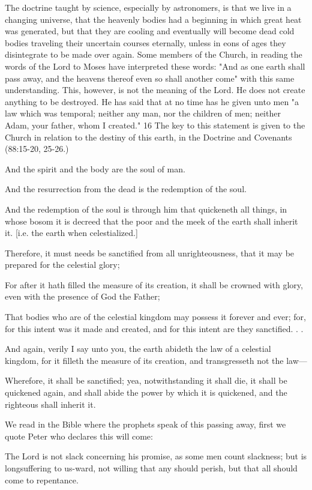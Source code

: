 The doctrine taught by science, especially by astronomers, is that we live in a changing
universe, that the heavenly bodies had a beginning in which great heat was generated, but
that they are cooling and eventually will become dead cold bodies traveling their uncertain
courses eternally, unless in eons of ages they disintegrate to be made over again. Some
members of the Church, in reading the words of the Lord to Moses have interpreted these
words: "And as one earth shall pass away, and the heavens thereof even so shall another
come" with this same understanding. This, however, is not the meaning of the Lord. He does
not create anything to be destroyed. He has said that at no time has he given unto men "a law
which was temporal; neither any man, nor the children of men; neither Adam, your father,
whom I created." 16 The key to this statement is given to the Church in relation to the destiny
of this earth, in the Doctrine and Covenants (88:15-20, 25-26.)

And the spirit and the body are the soul of man.

And the resurrection from the dead is the redemption of the soul.

And the redemption of the soul is through him that quickeneth all things, in whose bosom it
is decreed that the poor and the meek of the earth shall inherit it. [i.e. the earth when
celestialized.]

Therefore, it must needs be sanctified from all unrighteousness, that it may be prepared for
the celestial glory;

For after it hath filled the measure of its creation, it shall be crowned with glory, even with
the presence of God the Father;

That bodies who are of the celestial kingdom may possess it forever and ever; for, for this
intent was it made and created, and for this intent are they sanctified. . .

And again, verily I say unto you, the earth abideth the law of a celestial kingdom, for it filleth
the measure of its creation, and transgresseth not the law—

Wherefore, it shall be sanctified; yea, notwithstanding it shall die, it shall be quickened again,
and shall abide the power by which it is quickened, and the righteous shall inherit it.

We read in the Bible where the prophets speak of this passing away, first we quote Peter who
declares this will come:

The Lord is not slack concerning his promise, as some men count slackness; but is
longsuffering to us-ward, not willing that any should perish, but that all should come to
repentance.

